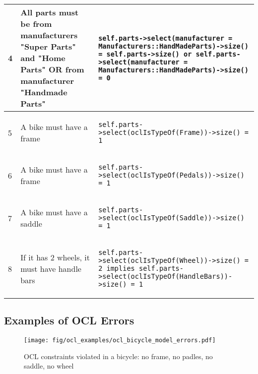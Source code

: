 \begin{table}[htp]
\begin{center}
\begin{tabular*}{\textwidth}{p{} p{}
	l{}}
4	&	All parts must be from manufacturers "Super Parts" and "Home Parts" OR from manufacturer "Handmade Parts" &
\begin{lstlisting}
self.parts->select(manufacturer = Manufacturers::HandMadeParts)->size() = self.parts->size() or self.parts->select(manufacturer = Manufacturers::HandMadeParts)->size() = 0
\end{lstlisting}  \\ \hline

5	&	A bike must have a frame &
\begin{lstlisting}
self.parts->select(oclIsTypeOf(Frame))->size() = 1
\end{lstlisting}  \\ \hline

6	&	A bike must have a frame &
\begin{lstlisting}
self.parts->select(oclIsTypeOf(Pedals))->size() = 1
\end{lstlisting}  \\ \hline

7	&	A bike must have a saddle &
\begin{lstlisting}
self.parts->select(oclIsTypeOf(Saddle))->size() = 1
\end{lstlisting}  \\ \hline

8	&	If it has 2 wheels, it must have handle bars &
\begin{lstlisting}
self.parts->select(oclIsTypeOf(Wheel))->size() = 2 implies self.parts->select(oclIsTypeOf(HandleBars))->size() = 1 
\end{lstlisting}  \\ \hline
	\end{tabular*}
\end{center}
\end{table}

\subsection{Examples of OCL Errors}

\begin{figure}[H]
    \begin{center}
        \texttt{[image: fig/ocl\_examples/ocl\_bicycle\_model\_errors.pdf]}
        \caption{OCL constraints violated in a bicycle: no frame, no padles, no
        saddle, no wheel}
        \label{fig.ocl_bike_errors}
    \end{center}
\end{figure}

